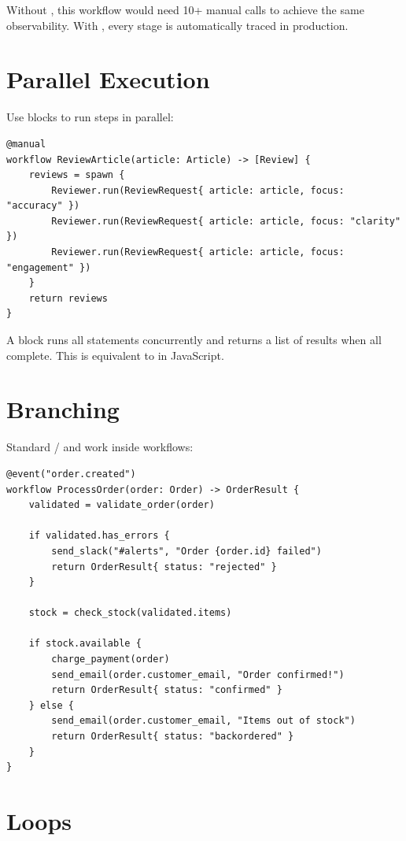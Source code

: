 Without , this workflow would need 10+ manual  calls to achieve the same observability. With , every stage is automatically traced in production.

\section{Parallel Execution}

Use  blocks to run steps in parallel:

\begin{lstlisting}
@manual
workflow ReviewArticle(article: Article) -> [Review] {
    reviews = spawn {
        Reviewer.run(ReviewRequest{ article: article, focus: "accuracy" })
        Reviewer.run(ReviewRequest{ article: article, focus: "clarity" })
        Reviewer.run(ReviewRequest{ article: article, focus: "engagement" })
    }
    return reviews
}
\end{lstlisting}

A  block runs all statements concurrently and returns a list of results when all complete. This is equivalent to  in JavaScript.

\section{Branching}

Standard / and  work inside workflows:

\begin{lstlisting}
@event("order.created")
workflow ProcessOrder(order: Order) -> OrderResult {
    validated = validate_order(order)

    if validated.has_errors {
        send_slack("#alerts", "Order {order.id} failed")
        return OrderResult{ status: "rejected" }
    }

    stock = check_stock(validated.items)

    if stock.available {
        charge_payment(order)
        send_email(order.customer_email, "Order confirmed!")
        return OrderResult{ status: "confirmed" }
    } else {
        send_email(order.customer_email, "Items out of stock")
        return OrderResult{ status: "backordered" }
    }
}
\end{lstlisting}

\section{Loops}

